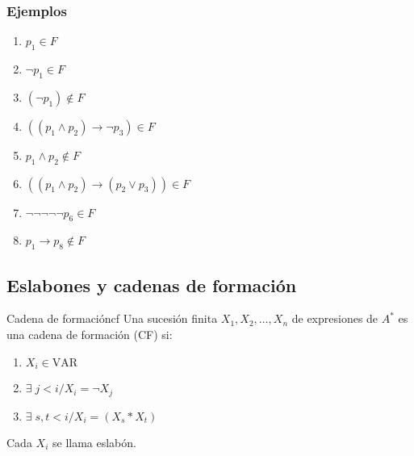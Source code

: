 \subsubsection{Ejemplos}

\begin{enumerate}
    \item $p_1 \in F$
    \item $\neg p_1 \in F$
    \item $(\neg p_1) \notin F$ %
    \item $((p_1 \wedge p_2) \to \neg p_3) \in F$
    \item $p_1 \wedge p_2 \notin F$ %
    \item $((p_1 \wedge p_2) \to (p_2 \vee p_3)) \in F$
    \item $\neg \neg \neg \neg \neg p_6 \in F$
    \item $p_1 \to p_8 \notin F$ %
\end{enumerate}


\subsection{Eslabones y cadenas de formación}

\begin{definicion}{Cadena de formación}{cf}
    Una sucesión finita $X_1, X_2, \dotsc, X_n$ de expresiones de 
    $A^{*}$ es una cadena de formación (CF) si:

    \begin{center}
        \begin{enumerate}[%
                        labelindent=*,
                        style=multiline,
                        leftmargin=*,
                        align=left,
                        leftmargin=2\parindent,
                        label=Caso \arabic*)]
            \item $X_i \in \mathrm{VAR}$ %
            \item $\exists \; j < i / X_i = \neg X_j$ %
            \item $\exists \; s,t<i / X_i = (X_s * X_t)$
        \end{enumerate}
    \end{center}

    Cada $X_i$ se llama eslabón.
\end{definicion}

